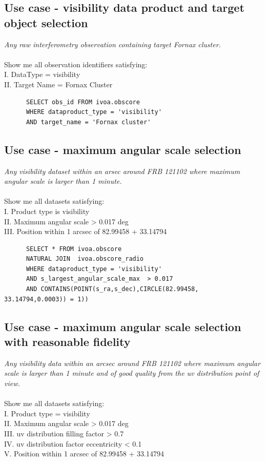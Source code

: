 
\subsection{ Use case - visibility data product and target object selection }
\textit{Any raw interferometry observation containing target Fornax cluster.}\\
\\
Show me all  observation identifiers satisfying:\\
I. DataType = visibility \\
II. Target Name = Fornax Cluster
\begin{verbatim}
      SELECT obs_id FROM ivoa.obscore
      WHERE dataproduct_type = 'visibility' 
      AND target_name = 'Fornax cluster'
\end{verbatim}

\subsection{Use case - maximum angular scale selection}
\textit{Any visibility dataset within an arsec around FRB 121102  where  maximum angular scale is larger than 1 minute.}\\ \\
Show me all datasets satisfying:\\
I. Product type is visibility \\
II. Maximum angular scale  >  0.017 deg \\
III. Position within 1 arcsec of 82.99458 + 33.14794
\begin{verbatim}
      SELECT * FROM ivoa.obscore 
      NATURAL JOIN  ivoa.obscore_radio
      WHERE dataproduct_type = 'visibility' 
      AND s_largest_angular_scale_max  > 0.017 
      AND CONTAINS(POINT(s_ra,s_dec),CIRCLE(82.99458, 33.14794,0.0003)) = 1))
\end{verbatim}

\subsection{Use case - maximum angular scale selection with reasonable fidelity}
\textit{Any visibility data within an arcsec around FRB 121102 where  maximum angular scale is larger than 1 minute  and of good quality from the uv distribution point of view.}\\ \\
Show me all datasets satisfying:\\
I. Product type = visibility \\
II. Maximum angular scale  >  0.017 deg \\
III. uv distribution filling factor  > 0.7 \\
IV. uv distribution factor eccentricity  < 0.1 \\
V. Position within 1 arcsec of 82.99458 + 33.14794

